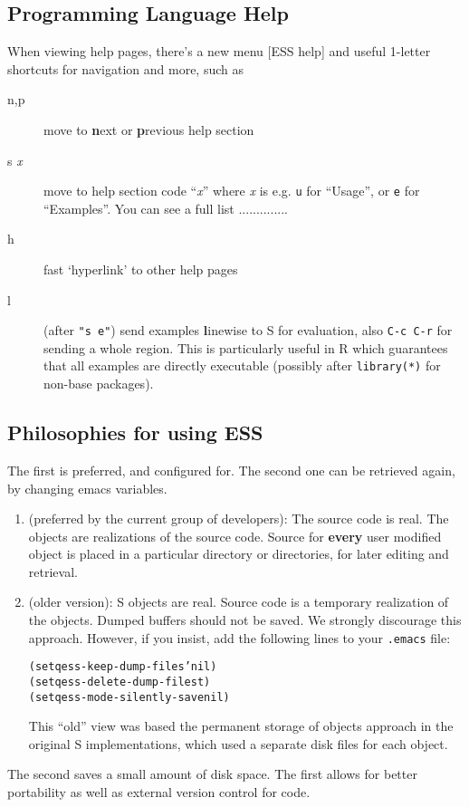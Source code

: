 \documentclass{article}
\newenvironment{Salltt}{\small\begin{alltt}}{\end{alltt}}
\begin{document}
\subsection{Programming Language Help}
\label{sec:S:help}
When viewing help pages, there's a new menu \textsf{[ESS help]} and
useful 1-letter shortcuts for navigation and more, such as
\begin{description}
\item[n,p] move to \textbf{n}ext or \textbf{p}revious help section
\item[s \textit{x}] move to help section code ``\textit{x}'' where
  \textit{x} is e.g. \texttt{u} for ``Usage'', or \texttt{e} for
  ``Examples''.  You can see a full list ..............

\item[h] fast `hyperlink' to other help pages

\item[l] (after \texttt{"s e"}) send examples \textbf{l}inewise to S for
  evaluation, also \texttt{C-c C-r} for sending a whole region.  This 
  is particularly useful in R which guarantees that all examples are
  directly executable (possibly after \texttt{library(*)} for non-base
  packages).
\end{description}

\subsection{Philosophies for using ESS}
\label{sec:S:philosophy}

The first is preferred, and configured for.  The second one can be
retrieved again, by changing emacs variables.

\begin{enumerate}
\item 
  (preferred by the current group of developers):  The source code is 
   real.  The objects are realizations of the source code.  Source
   for \textbf{every} user modified object is placed in a particular directory
   or directories, for later editing and retrieval.

\item (older version): S objects are real.  Source code is a temporary
   realization of the objects.  Dumped buffers should not be saved.
   We strongly discourage this approach.  However, if you insist,
   add the following lines to your \texttt{.emacs} file:\\[-1ex]
   \begin{Salltt}
      (setq ess-keep-dump-files 'nil)
      (setq ess-delete-dump-files t)
      (setq ess-mode-silently-save nil)
   \end{Salltt}
   This ``old'' view was based the permanent storage of objects
   approach in the original S implementations, which used a separate
   disk files for each object.

\end{enumerate}
The second saves a small amount of disk space.  The first allows for
better portability as well as external version control for code.
\end{document}
